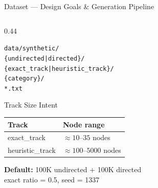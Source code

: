 \documentclass[aspectratio=169,10pt]{beamer}
\renewcommand{\footnotesize}{\tiny}
\begin{document}
\begin{frame}{Dataset — Design Goals \& Generation Pipeline}
\begin{columns}[T]
\begin{column}{0.44\textwidth}
\begin{tcolorbox}[mybox,title=Directory Contract]
        \footnotesize
        \texttt{data/synthetic/}\\
        \quad\texttt{\{undirected|directed\}/}\\
        \quad\quad\texttt{\{exact\_track|heuristic\_track\}/}\\
        \quad\quad\quad\texttt{\{category\}/}\\
        \quad\quad\quad\quad\texttt{*.txt}
      \end{tcolorbox}
      \vspace{6pt}
      \begin{block}{Track Size Intent}
        \begin{tabular}{ll}
          \toprule
          Track & Node range\\
          \midrule
          exact\_track & $\approx 10$--$35$ nodes\\
          heuristic\_track & $\approx 100$--$5000$ nodes\\
          \bottomrule
        \end{tabular}
      \end{block}
      \vspace{4pt}
      \begin{tcolorbox}[greenbox,fontupper=\footnotesize]
        \textbf{Default:} 100K undirected + 100K directed\\
        exact ratio = 0.5, seed = 1337
      \end{tcolorbox}
    \end{column}
  \end{columns}
\end{frame}
\end{document}
